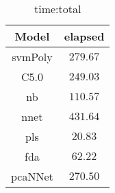 \begin{table}[!ht]
	\centering
	\begin{tabular}{|c|c|}
		\hline
		Model & elapsed \\ \hline
		svmPoly & $279.67$ \\ \hline
		C5.0 & $249.03$ \\ \hline
		nb & $110.57$ \\ \hline
		nnet & $431.64$ \\ \hline
		pls & $20.83$ \\ \hline
		fda & $62.22$ \\ \hline
		pcaNNet & $270.50$ \\ \hline
	\end{tabular}
	\caption{time:total}
	\label{tab:time:total}
\end{table}
